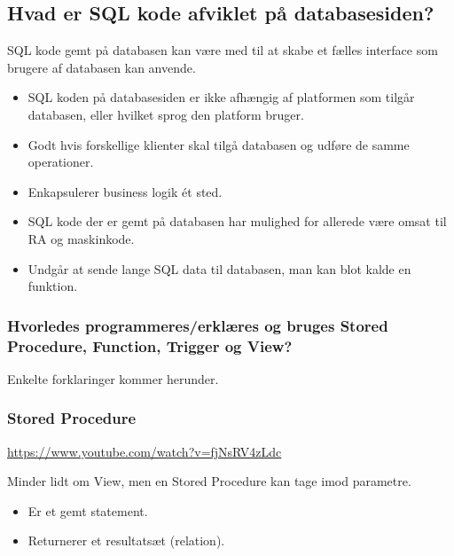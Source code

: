 \newpage

\subsection{Hvad er SQL kode afviklet på databasesiden?}

SQL	kode gemt på databasen kan være	med	til	at skabe et	fælles interface som	brugere	af databasen kan anvende.

\begin{itemize}
	\item SQL koden	på databasesiden er	ikke afhængig af platformen	som	tilgår	databasen, eller hvilket sprog den platform	bruger.
	\item Godt hvis forskellige klienter skal tilgå databasen og udføre de samme operationer.
	\item Enkapsulerer business logik ét sted.
	\item SQL kode der er gemt på databasen	har	mulighed for allerede være omsat til	RA og maskinkode.
	\item Undgår at	sende lange	SQL	data til databasen,	man	kan	blot kalde en	funktion.
\end{itemize}

\subsubsection{Hvorledes programmeres/erklæres og bruges Stored Procedure, Function, Trigger og View?}
Enkelte forklaringer kommer herunder.

\subsubsection{Stored Procedure}

\url{https://www.youtube.com/watch?v=fjNsRV4zLdc}

Minder lidt om View, men en Stored Procedure kan tage imod parametre.

\begin{itemize}
	\item Er et gemt statement.
	\item Returnerer et resultatsæt (relation).
\end{itemize}

